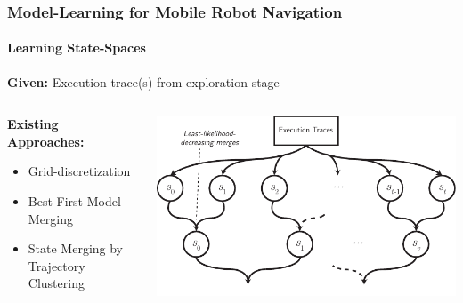 \begin{frame}
	\frametitle{Model-Learning for Mobile Robot Navigation}
	\framesubtitle{Learning State-Spaces}
	\textbf{Given:} Execution trace(s) from exploration-stage 
	\begin{columns}[T]
		\begin{column}{0.4\textwidth}
			\vspace{12pt}
			\textbf{Existing Approaches:}
			\begin{itemize}
				\item Grid-discretization
				\item \textcolor{tudblue}{Best-First Model Merging}
				\item State Merging by Trajectory Clustering
			\end{itemize}
			\vspace{18pt}
			\small
		\end{column}
		\begin{column}{0.525\textwidth}
			\includegraphics[width=1.11\textwidth]{figures/model-merging-bfmm}
		\end{column}
	\end{columns}
\end{frame}


